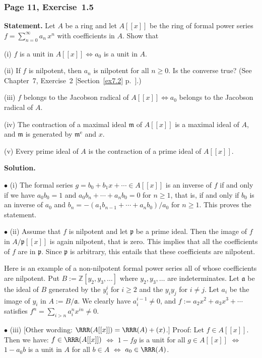 \documentclass[12pt,letterpaper]{article}%
\newcommand{\oo}{\operatorname}\newcommand{\ooo}{\operatorname*}
\newcommand{\mf}{\mathfrak}
\newcommand{\aaa}{\mf a}
\newcommand{\mmm}{\mf m}
\newcommand{\ppp}{\mf p}
\newcommand{\bu}{\bullet}
\newcommand{\nn}{\noindent}
\begin{document}
\subsubsection{Page 11, Exercise~1.5}\label{ex1.5}%

\textbf{Statement.} Let $A$ be a ring and let $A[[x]]$ be the ring of formal power series $f=\sum_{n=0}^\infty a_n\,x^n$ with coefficients in $A$. Show that

\nn(i) $f$ is a unit in $A[[x]]\iff a_0$ is a unit in $A$.

\nn(ii) If $f$ is nilpotent, then $a_n$ is nilpotent for all $n\ge0$. Is the converse true? (See Chapter~7, Exercise~2 [Section~\ref{ex7.2} p.~\pageref{ex7.2}].)

\nn(iii) $f$ belongs to the Jacobson radical of $A[[x]]\iff a_0$ belongs to the Jacobson radical of $A$.

\nn(iv) The contraction of a maximal ideal $\mmm$ of $A[[x]]$ is a maximal ideal of $A$, and $\mmm$ is generated by $\mmm^{\oo e}$ and $x$.

\nn(v) Every prime ideal of $A$ is the contraction of a prime ideal of $A[[x]]$.

\nn\textbf{Solution.} 

\nn$\bu$ (i) The formal series $g=b_0+b_1x+\cdots\in A[[x]]$ is an inverse of $f$ if and only if we have $a_0b_0=1$ and $a_0b_n+\cdots+a_nb_0=0$ for $n\ge1$, that is, if and only if $b_0$ is an inverse of $a_0$ and $b_n=-(a_1b_{n-1}+\cdots+a_nb_0)/a_0$ for $n\ge1$. This proves the statement.

\nn$\bu$ (ii) Assume that $f$ is nilpotent and let $\ppp$ be a prime ideal. Then the image of $f$ in $A/\ppp[[x]]$ is again nilpotent, that is zero. This implies that all the coefficients of $f$ are in $\ppp$. Since $\ppp$ is arbitrary, this entails that these coefficients are nilpotent.

Here is an example of a non-nilpotent formal power series all of whose coefficients are nilpotent. Put $B:=\mathbb Z[y_2,y_3,\dots]$ where $y_2,y_3,\dots$ are indeterminates. Let $\aaa$ be the ideal of $B$ generated by the $y_i^i$ for $i\ge2$ and the $y_iy_j$ for $i\neq j$. Let $a_i$ be the image of $y_i$ in $A:=B/\aaa$. We clearly have $a_i^{i-1}\neq0$, and $f:=a_2x^2+a_3x^3+\cdots$ satisfies $f^n=\sum_{i>n}a_i^nx^{in}\neq0$. 

\nn$\bu$ (iii) [Other wording: $\RRR(A[[x]])=\RRR(A)+(x)$.] Proof: Let $f\in A[[x]]$. Then we have: $f\in\RRR(A[[x]])$ $\iff$ $1-fg$ is a unit for all $g\in A[[x]]$ $\iff$  $1-a_0b$ is a unit in $A$ for all $b\in A$ $\iff$ $a_0\in\RRR(A)$.
\end{document}
